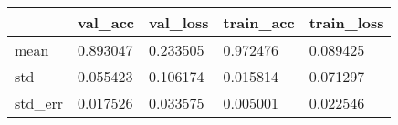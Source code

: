 \begin{tabular}{|l|l|l|l|l|}
\toprule \hline
 & val\_acc & val\_loss & train\_acc & train\_loss \\ \hline
\midrule
mean & 0.893047 & 0.233505 & 0.972476 & 0.089425 \\ \hline
std & 0.055423 & 0.106174 & 0.015814 & 0.071297 \\ \hline
std\_err & 0.017526 & 0.033575 & 0.005001 & 0.022546 \\ \hline
\bottomrule
\end{tabular}
